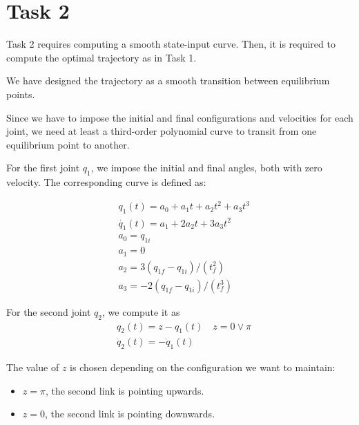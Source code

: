 \chapter*{Task 2}

Task 2 requires computing a smooth state-input curve. Then, it is required to compute the optimal trajectory as in Task 1.

We have designed the trajectory as a smooth transition between equilibrium points.

Since we have to impose the initial and final configurations and velocities for each joint, we need at least a third-order polynomial curve to transit from one equilibrium point to another.

For the first joint $q_1$, we impose the initial and final angles, both with zero velocity. The corresponding curve is defined as:


\begin{equation} \label{smooth_q1}
    \begin{aligned}
         &q_1(t) = a_0 + a_1t + a_2 t^2 + a_3 t^3 \\
         &\Dot{q_1}(t) = a_1 + 2a_2 t + 3a_3 t^2 \\
         &a_0 = q_{1i}\\
         &a_1 = 0\\
         &a_2 = 3 (q_{1f} - q_{1i})/(t_f^2)\\
         &a_3 = -2 (q_{1f} - q_{1i})/(t_f^3)
    \end{aligned}
\end{equation}

For the second joint $q_2$, we compute it as
\begin{equation} \label{smooth_q2}
    \begin{aligned}
            &q_2(t) = z - q_1(t) \quad z = 0 \lor \pi \\
            &\Dot{q}_2(t) = - \Dot{q}_1(t)
    \end{aligned}
\end{equation}

The value of $z$ is chosen depending on the configuration we want to maintain:

\begin{itemize}
    \item $z = \pi$, the second link is pointing upwards.
    \item $z = 0$, the second link is pointing downwards.
\end{itemize}

